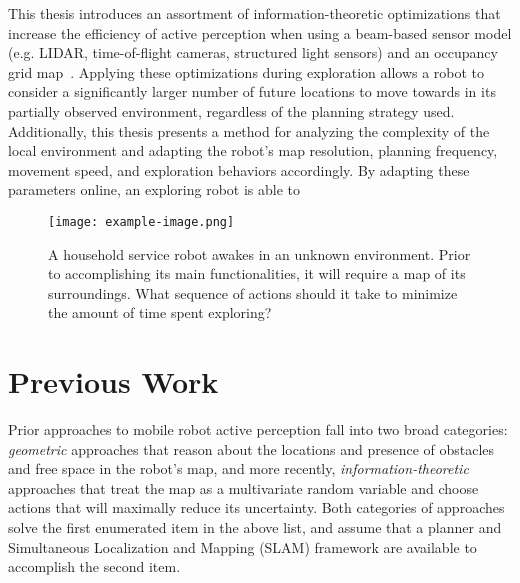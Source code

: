This thesis introduces an assortment of information-theoretic optimizations that
increase the efficiency of active perception when using a beam-based sensor
model (e.g. LIDAR, time-of-flight cameras, structured light sensors) and
an occupancy grid map~\cite{elfes1989using}. Applying these optimizations during exploration allows a
robot to consider a significantly larger number of future locations to move
towards in its partially observed environment, regardless of the planning
strategy used. Additionally, this thesis presents a method for analyzing the
complexity of the local environment and adapting the robot's map resolution,
planning frequency, movement speed, and exploration behaviors accordingly. By
adapting these parameters online, an exploring robot is able to


\begin{figure}[ht]
  \centering
  \texttt{[image: example-image.png]}
  \caption{A household service robot awakes in an unknown environment. Prior to
  accomplishing its main functionalities, it will require a map of its surroundings.
What sequence of actions should it take to minimize the amount of time spent
exploring? \label{fig:motivation}}
\end{figure}

\section{Previous Work}

Prior approaches to mobile robot active perception fall into two
broad categories: \textit{geometric} approaches that reason about the locations and
presence of obstacles and
free space in the robot's map\todo{~\cite{}},
and more recently, \textit{information-theoretic} approaches that treat the map as
a multivariate random variable and choose actions that will maximally reduce
its uncertainty\todo{~\cite{}}.
Both categories of approaches solve the first
enumerated item in the above list, and assume that a planner and Simultaneous
Localization and Mapping (SLAM) framework are available to accomplish the second
item.

